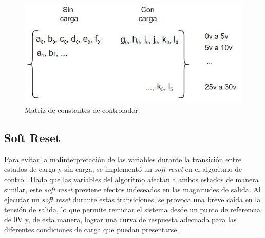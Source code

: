 \begin{figure}[H]
    \centering
    \includegraphics[scale=0.5]{./imagenes/matriz.jpg}
    \caption{Matriz de constantes de controlador.}
    \label{F:matriz_control}
\end{figure}

\subsection{Soft Reset}
Para evitar la malinterpretación de las variables durante la transición entre estados de carga y sin carga, se implementó un \textit{soft reset} en el algoritmo de control. Dado que las variables del algoritmo afectan a ambos estados de manera similar, este \textit{soft reset} previene efectos indeseados en las magnitudes de salida. Al ejecutar un \textit{soft reset} durante estas transiciones, se provoca una breve caída en la tensión de salida, lo que permite reiniciar el sistema desde un punto de referencia de 0V y, de esta manera, lograr una curva de respuesta adecuada para las diferentes condiciones de carga que puedan presentarse.

